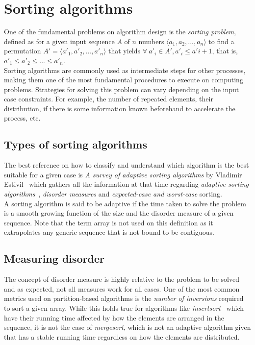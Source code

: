 \section{Sorting algorithms}
One of the fundamental problems on algorithm design is the \textit{sorting problem}, defined as for a given input sequence $A$ of $n$ numbers $\langle a_1, a_2,...,a_n \rangle$ to find a permutation $A' = \langle a'_1, a'_2,...,a'_n \rangle$ that yields $\forall~a'_i \in A', a'_i \leq a'{i+1}$, that is, $a'_1 \leq a'_2 \leq ... \leq a'_n $.\\

Sorting algorithms are commonly used as intermediate steps for other processes, making them one of the most fundamental procedures to execute on computing problems. Strategies for solving this problem can vary depending on the input case constraints. For example, the number of repeated elements, their distribution, if there is some information known beforehand to accelerate the process, etc.\\

\subsection{Types of sorting algorithms}
The best reference on how to classify and understand which algorithm is the best suitable for a given case is \textit{A survey of adaptive sorting algorithms} by Vladimir Estivil~\cite{estivil92} which gathers all the information at that time regarding \textit{adaptive sorting algorithms}~\cite{Mehlhorn_1984}, \textit{disorder measures} and \textit{expected-case and worst-case} sorting.\\

A sorting algorithm is said to be adaptive if the time taken to solve the problem is a smooth growing function of the size and the disorder measure of a given sequence. Note that the term array is not used on this definition as it extrapolates any generic sequence that is not bound to be contiguous.\\

\subsection{Measuring disorder}
\label{SEC:MEASURING_DISORDER}
The concept of disorder measure is highly relative to the problem to be solved and as expected, not all measures work for all cases. One of the most common metrics used on partition-based algorithms is the \textit{number of inversions} required to sort a given array. While this holds true for algorithms like \textit{insertsort}~\cite{10.5555/150918} which have their running time affected by how the elements are arranged in the sequence, it is not the case of \textit{mergesort}, which is not an adaptive algorithm given that has a stable running time regardless on how the elements are distributed. \\

